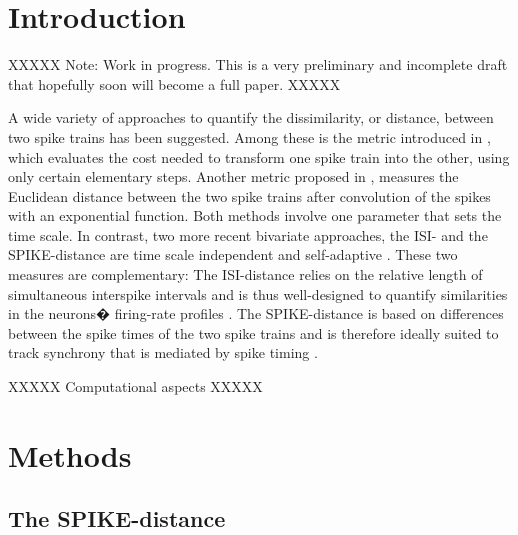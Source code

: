 \documentclass[10pt,twocolumn]{elsart5p}
\begin{document}
\newcommand{\abb}{\small\sf}

%
%
\section{\label{s:Intro} Introduction}

XXXXX Note: Work in progress. This is a very preliminary and incomplete draft that hopefully soon will become a full paper.  XXXXX

A wide variety of approaches to quantify the dissimilarity, or distance, between two spike trains has been suggested. Among these is the metric introduced in \citet{Victor96}, which evaluates the cost needed to transform one spike train into the other, using only certain elementary steps. Another metric proposed in \citet{VanRossum01}, measures the Euclidean distance between the two spike trains after convolution of the spikes with an exponential function. Both methods involve one parameter that sets the time scale. In contrast, two more recent bivariate approaches, the ISI- and the SPIKE-distance are time scale independent and self-adaptive \citep{Kreuz07c, Kreuz13}. These two measures are complementary: The ISI-distance relies on the relative length of simultaneous interspike intervals and is thus well-designed to quantify similarities in the neurons� firing-rate profiles \citep{Kreuz07c, Kreuz09}. The SPIKE-distance is based on differences between the spike times of the two spike trains and is therefore ideally suited to track synchrony that is mediated by spike timing \citep{Kreuz11, Kreuz13}.

XXXXX Computational aspects XXXXX

%
%
\section{\label{s:Methods} Methods}




\subsection{\label{ss:SPIKE-Distance} The SPIKE-distance}
\end{document}
